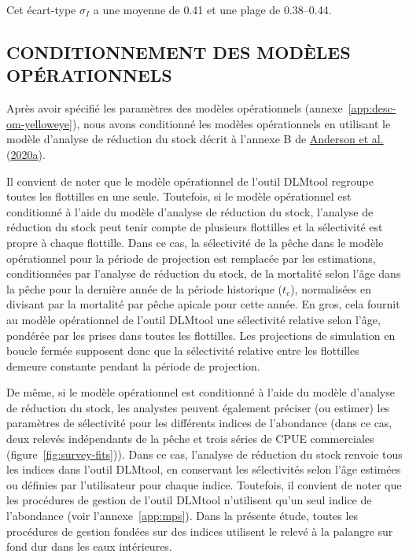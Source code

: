 \documentclass[11pt]{book}
\begin{document}
Cet écart-type \(\sigma_I\) a une moyenne de 0.41 et une plage de 0.38--0.44.

\hypertarget{sec:approach3-conditioning}{%
\subsection{CONDITIONNEMENT DES MODÈLES OPÉRATIONNELS}\label{sec:approach3-conditioning}}

Après avoir spécifié les paramètres des modèles opérationnels (annexe~\ref{app:desc-om-yelloweye}), nous avons conditionné les modèles opérationnels en utilisant le modèle d'analyse de réduction du stock décrit à l'annexe B de \protect\hyperlink{ref-anderson2020gfmp}{Anderson et al.} (\protect\hyperlink{ref-anderson2020gfmp}{2020a}).

Il convient de noter que le modèle opérationnel de l'outil DLMtool regroupe toutes les flottilles en une seule. Toutefois, si le modèle opérationnel est conditionné à l'aide du modèle d'analyse de réduction du stock, l'analyse de réduction du stock peut tenir compte de plusieurs flottilles et la sélectivité est propre à chaque flottille. Dans ce cas, la sélectivité de la pêche dans le modèle opérationnel pour la période de projection est remplacée par les estimations, conditionnées par l'analyse de réduction du stock, de la mortalité selon l'âge dans la pêche pour la dernière année de la période historique (\(t_c\)), normalisées en divisant par la mortalité par pêche apicale pour cette année. En gros, cela fournit au modèle opérationnel de l'outil DLMtool une sélectivité relative selon l'âge, pondérée par les prises dans toutes les flottilles. Les projections de simulation en boucle fermée supposent donc que la sélectivité relative entre les flottilles demeure constante pendant la période de projection.

De même, si le modèle opérationnel est conditionné à l'aide du modèle d'analyse de réduction du stock, les analystes peuvent également préciser (ou estimer) les paramètres de sélectivité pour les différents indices de l'abondance (dans ce cas, deux relevés indépendants de la pêche et trois séries de CPUE commerciales (figure~\ref{fig:survey-fits})). Dans ce cas, l'analyse de réduction du stock renvoie tous les indices dans l'outil DLMtool, en conservant les sélectivités selon l'âge estimées ou définies par l'utilisateur pour chaque indice. Toutefois, il convient de noter que les procédures de gestion de l'outil DLMtool n'utilisent qu'un seul indice de l'abondance (voir l'annexe~\ref{app:mps}). Dans la présente étude, toutes les procédures de gestion fondées sur des indices utilisent le relevé à la palangre sur fond dur dans les eaux intérieures.
\end{document}
